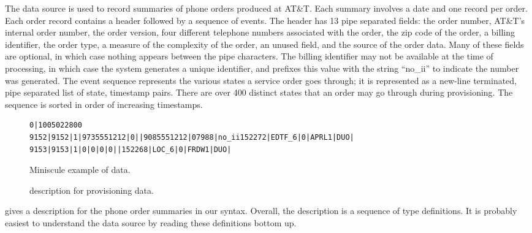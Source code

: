 The \dibbler{} data source is used to record summaries of phone orders
produced at AT\&T.  Each summary involves a date and one record per
order.  Each order record contains a header followed by a sequence of
events.  The header has 13 pipe separated fields: the order number,
AT\&T's internal order number, the order version, four different
telephone numbers associated with the order, the zip code of the
order, a billing identifier, the order type, a measure of the
complexity of the order, an unused field, and the source of the order
data.  Many of these fields are optional, in which case nothing
appears between the pipe characters.  The billing identifier may not
be available at the time of processing, in which case the system
generates a unique identifier, and prefixes this value with the string
``no\_ii'' to indicate the number was generated. The event sequence
represents the various states a service order goes through; it is
represented as a new-line terminated, pipe separated list of state,
timestamp pairs.  There are over 400 distinct states that an order may
go through during provisioning.  The sequence is sorted in order of
increasing timestamps.


\begin{figure*}
{\scriptsize
\begin{verbatim}
0|1005022800
9152|9152|1|9735551212|0||9085551212|07988|no_ii152272|EDTF_6|0|APRL1|DUO|
9153|9153|1|0|0|0|0||152268|LOC_6|0|FRDW1|DUO|
\end{verbatim}
}
  \caption{Miniscule example of \dibbler{} data.}
  \label{figure:dibbler-records}
\end{figure*}

\suppressfloats

\begin{figure}
  
  \caption{\padsml{} description for \dibbler{} provisioning data.}
  \label{figure:sirius_pml}
\end{figure}


 gives a \padsml{} description for the
\dibbler{} phone order summaries in our syntax.  Overall, the
description is a sequence of type definitions. It is probably easiest
to understand the data source by reading these definitions bottom up.

